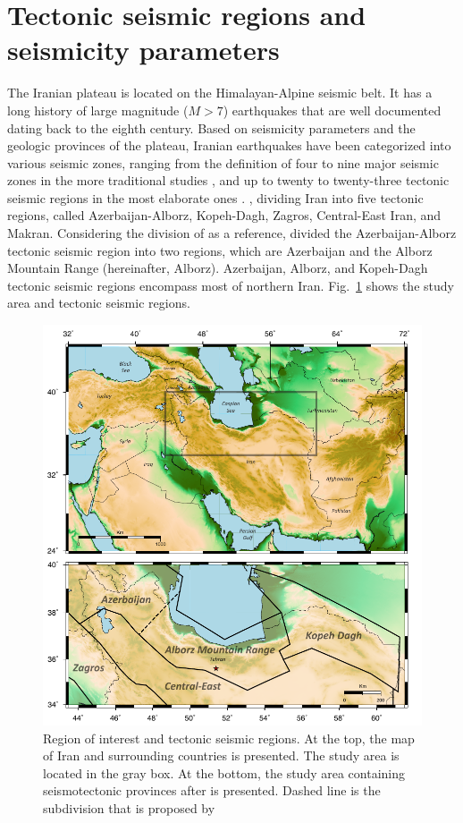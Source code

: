 \section{Tectonic seismic regions and seismicity parameters}
\noindent
The Iranian plateau is located on the Himalayan-Alpine seismic belt. It has a long history of large magnitude ($M>7$) earthquakes that are well documented dating back to the eighth century. Based on seismicity parameters and the geologic provinces of the plateau, Iranian earthquakes have been categorized into various seismic zones, ranging from the definition of four to nine major seismic zones in the more traditional studies \citep[e.g.,][]{Stocklin1968,Takin1972,Berberian1976}, and up to twenty to twenty-three tectonic seismic regions in the most elaborate ones \citep[e.g.,][]{Nowroozi1976,Tavakoli1999}. \citet{Mirzaei1998},  dividing Iran into five tectonic regions, called Azerbaijan-Alborz, Kopeh-Dagh, Zagros, Central-East Iran, and Makran. Considering the division of  \citet{Mirzaei1998} as a reference,  \citet{Karimiparidari2013}  divided the Azerbaijan-Alborz tectonic seismic region into two regions, which are Azerbaijan and the Alborz Mountain Range (hereinafter, Alborz). Azerbaijan, Alborz, and Kopeh-Dagh tectonic seismic regions encompass most of northern Iran.  Fig.~\ref{fig:study_region} shows the study area and tectonic seismic regions. \\
 
\begin{figure} [ht]
\centering
\includegraphics[scale=1]{figures/pdf/Figure02.pdf} 
\caption{Region of interest and tectonic seismic regions. At the top, the map of Iran and surrounding countries is presented. The study area is located in the gray box. At the bottom, the study area containing seismotectonic provinces after \citet{Mirzaei1998} is presented. Dashed line is the subdivision that is proposed by \citet{Karimiparidari2013}}
\label{fig:study_region}
\end{figure}
  
